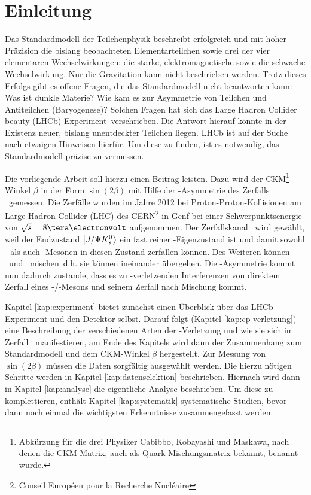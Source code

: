 \chapter{Einleitung}
Das Standardmodell der Teilchenphysik beschreibt erfolgreich und mit hoher Präzision die bislang beobachteten Elementarteilchen sowie drei der vier elementaren Wechselwirkungen: die starke, elektromagnetische sowie die schwache Wechselwirkung. Nur die Gravitation kann nicht beschrieben werden. Trotz dieses Erfolgs gibt es offene Fragen, die das Standardmodell nicht beantworten kann: Was ist dunkle Materie? Wie kam es zur Asymmetrie von Teilchen und Antiteilchen (Baryogenese)? Solchen Fragen hat sich das \glqq Large Hadron Collider beauty (LHCb) Experiment\grqq\ verschrieben. Die Antwort hierauf könnte in der Existenz neuer, bislang unentdeckter Teilchen liegen. LHCb ist auf der Suche nach etwaigen Hinweisen hierfür.  Um diese zu finden, ist es notwendig, das Standardmodell präzise zu vermessen. \cite{cern-courier, roadmap}

Die vorliegende Arbeit soll hierzu einen Beitrag leisten. Dazu wird der CKM\footnote{Abkürzung für die drei Physiker Cabibbo, Kobayashi und Maskawa, nach denen die CKM-Matrix, auch als Quark-Mischungsmatrix bekannt, benannt wurde.}-Winkel $\beta$ in der Form $\sin(2\beta)$ mit Hilfe der \CP-Asymmetrie des Zerfalls \Decaychannel\ gemessen. Die Zerfälle wurden im Jahre 2012 bei Pro\-ton-Prot\-on-Kol\-li\-si\-onen am Large Hadron Collider (LHC) des CERN\footnote{Conseil Européen pour la Recherche Nucléaire} in Genf bei einer Schwerpunktsenergie von $\sqrt{s}=8\tera\electronvolt$ aufgenommen. Der Zerfallskanal \Decaychannel\ wird gewählt, weil der Endzustand $\Ket{J/\Psi K_s^0}$ ein fast reiner \CP-Eigenzustand ist und damit sowohl \Bd- als auch \Bdbar-Mesonen in diesen Zustand zerfallen können. Des Weiteren können \Bd\ und \Bdbar\ \glqq mischen\grqq\, d.h. sie können ineinander übergehen. Die \CP-Asymmetrie kommt nun dadurch zustande, dass es zu \CP-verletzenden Interferenzen von direktem Zerfall eines \Bd-/\Bdbar-Mesons und seinem Zerfall nach Mischung kommt.

Kapitel \ref{kap:experiment} bietet zunächst einen Überblick über das LHCb-Experiment und den Detektor selbst. Darauf folgt (Kapitel \ref{kap:cp-verletzung}) eine Beschreibung der verschiedenen Arten der \CP-Verletzung und wie sie sich im Zerfall \Decaychannel\ manifestieren, am Ende des Kapitels wird dann der Zusammenhang zum Standardmodell und dem CKM-Winkel $\beta$ hergestellt. Zur Messung von $\sin(2\beta)$ müssen die Daten sorgfältig ausgewählt werden. Die hierzu nötigen Schritte werden in Kapitel \ref{kap:datenselektion} beschrieben. Hiernach wird dann in Kapitel \ref{kap:analyse} die eigentliche Analyse beschrieben. Um diese zu komplettieren, enthält Kapitel \ref{kap:systematik} systematische Studien, bevor dann noch einmal die wichtigsten Erkenntnisse zusammengefasst werden.